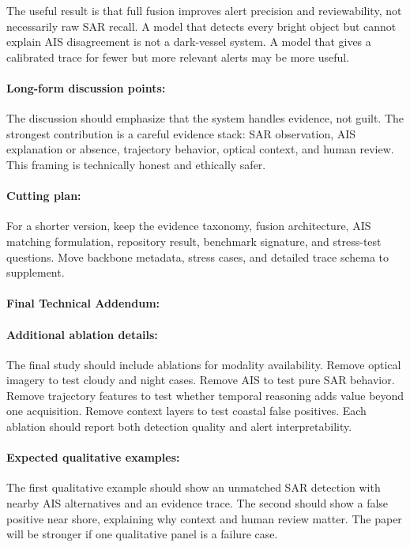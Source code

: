 \documentclass{article}
\begin{document}
The useful result is that full fusion improves alert precision and reviewability, not necessarily raw SAR recall. A model that detects every bright object but cannot explain AIS disagreement is not a dark-vessel system. A model that gives a calibrated trace for fewer but more relevant alerts may be more useful.

\paragraph{Long-form discussion points:}

The discussion should emphasize that the system handles evidence, not guilt. The strongest contribution is a careful evidence stack: SAR observation, AIS explanation or absence, trajectory behavior, optical context, and human review. This framing is technically honest and ethically safer.

\paragraph{Cutting plan:}

For a shorter version, keep the evidence taxonomy, fusion architecture, AIS matching formulation, repository result, benchmark signature, and stress-test questions. Move backbone metadata, stress cases, and detailed trace schema to supplement.

\paragraph{Final Technical Addendum:}

\paragraph{Additional ablation details:}

The final study should include ablations for modality availability. Remove optical imagery to test cloudy and night cases. Remove AIS to test pure SAR behavior. Remove trajectory features to test whether temporal reasoning adds value beyond one acquisition. Remove context layers to test coastal false positives. Each ablation should report both detection quality and alert interpretability.

\paragraph{Expected qualitative examples:}

The first qualitative example should show an unmatched SAR detection with nearby AIS alternatives and an evidence trace. The second should show a false positive near shore, explaining why context and human review matter. The paper will be stronger if one qualitative panel is a failure case.
\end{document}
